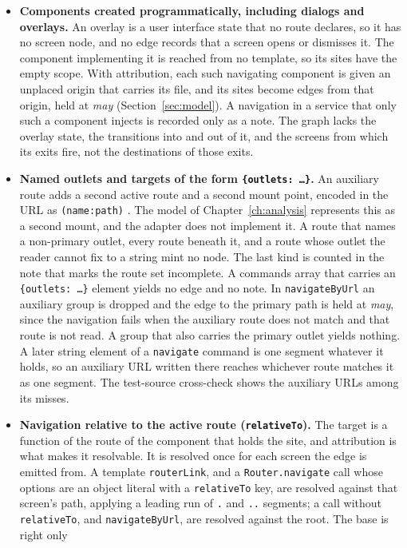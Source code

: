 \begin{itemize}[nosep]
\item \textbf{Components created programmatically, including dialogs and overlays.} An overlay is a
user interface state that no route declares, so it has no screen node, and no edge records that a
screen opens or dismisses it. The component implementing it is reached from no template, so its sites
have the empty scope. With attribution, each such navigating component is given an unplaced origin that
carries its file, and its sites become edges from that origin, held at \emph{may}
(Section~\ref{sec:model}). A navigation in a service that only such a component injects is recorded only
as a note. The graph lacks the overlay state, the transitions into and out of it, and the screens from
which its exits fire, not the destinations of those exits.
\item \textbf{Named outlets and targets of the form \texttt{\{outlets: \ldots\}}.} An auxiliary route
adds a second active route and a second mount point, encoded in the URL as \texttt{(name:path)}
\cite{angulardocs}. The model of Chapter~\ref{ch:analysis} represents this as a second mount, and the
adapter does not implement it. A route that names a non-primary outlet, every route beneath it, and a
route whose outlet the reader cannot fix to a string mint no node.
The last kind is counted in the note that marks the route set incomplete. A commands array that carries an \texttt{\{outlets: \ldots\}}
element yields no edge and no note. In \texttt{navigateByUrl} an auxiliary group is dropped and the edge
to the primary path is held at \emph{may}, since the navigation fails when the auxiliary route does not
match and that route is not read.
A group that also carries the primary outlet yields nothing. A later
string element of a \texttt{navigate} command is one segment whatever it holds, so an auxiliary URL
written there reaches whichever route matches it as one segment. The test-source cross-check shows the
auxiliary URLs among its misses.
\item \textbf{Navigation relative to the active route (\texttt{relativeTo}).} The target is a function
of the route of the component that holds the site, and attribution is what makes it resolvable.
It is resolved once for each screen the edge is emitted from. A template \texttt{routerLink}, and a
\texttt{Router.navigate} call whose options are an object literal with a \texttt{relativeTo} key, are
resolved against that screen's path, applying a leading run of \texttt{.} and \texttt{..} segments; a
call without \texttt{relativeTo}, and \texttt{navigateByUrl}, are resolved against the root. The base is right only

\end{itemize}
